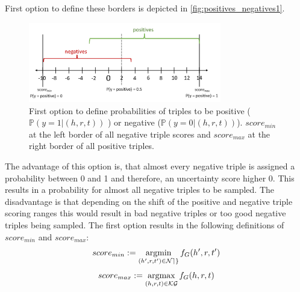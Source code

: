 First option to define these borders is depicted in \autoref{fig:positives_negatives1}.
\begin{figure}[t]
  \centering
    \includegraphics[width=0.75\textwidth]{figures/positives_negatives1.PNG}
  \caption{First option to define probabilities of triples to be positive ($\mathds{P}(y = 1 | (h,r,t))$ ) or negative ($\mathds{P}(y = 0 | (h,r,t))$). 
  $score_{min}$ at the left border of all negative triple scores and $score_{max}$ at the right border of all positive triples.}
  \label{fig:positives_negatives1}
\end{figure}
The advantage of this option is, that almost every negative triple is assigned a probability between 0 and 1 and therefore, an uncertainty score higher 0.
This results in a probability for almost all negative triples to be sampled.
The disadvantage is that depending on the shift of the positive and negative triple scoring ranges this would result in bad negative triples or too good negative triples being sampled.
The first option results in the following definitions of $score_{min}$ and $score_{max}$:
\begin{equation} \label{eqn:opt1_score_min}
    score_{min} := \operatorname*{argmin}_{(h',r,t') \in \mathcal{Neg}}{f_G(h',r,t')}
\end{equation}
\begin{equation} \label{eqn:opt1_score_max}
    score_{max} := \operatorname*{argmax}_{(h,r,t) \in \mathcal{KG}}{f_G(h,r,t)}
\end{equation}

